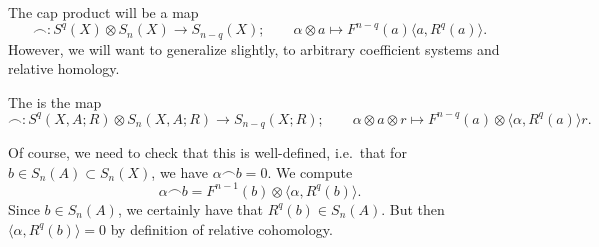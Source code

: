 \documentclass[main.tex]{subfiles}
\begin{document}
The cap product will be a map
\begin{equation*}
  \frown\colon S^{q}(X) \otimes S_{n}(X) \to S_{n-q}(X);\qquad \alpha \otimes a \mapsto F^{n-q}(a)\langle a, R^{q}(a) \rangle.
\end{equation*}
However, we will want to generalize slightly, to arbitrary coefficient systems and relative homology.

\begin{definition}
  \label{def:cap_product}
  The  is the map
  \begin{equation*}
    \frown\colon S^{q}(X, A; R) \otimes S_{n}(X, A; R) \to S_{n-q}(X; R); \qquad \alpha \otimes a \otimes r \mapsto F^{n-q}(a) \otimes \langle \alpha, R^{q}(a) \rangle r.
  \end{equation*}
\end{definition}

Of course, we need to check that this is well-defined, i.e.\ that for $b \in S_{n}(A) \subset S_{n}(X)$, we have $\alpha \frown b = 0$. We compute
\begin{equation*}
  \alpha \frown b = F^{n-1}(b) \otimes \langle \alpha, R^{q}(b) \rangle.
\end{equation*}
Since $b \in S_{n}(A)$, we certainly have that $R^{q}(b) \in S_{n}(A)$. But then $\langle\alpha, R^{q}(b)\rangle = 0$ by definition of relative cohomology.
\end{document}
